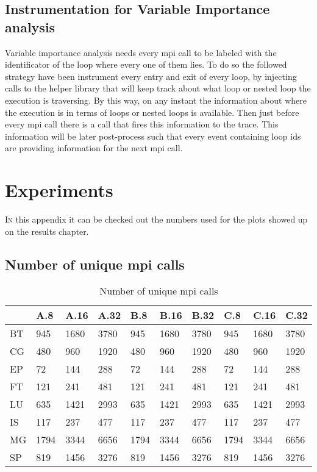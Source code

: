 \section{Instrumentation for Variable Importance analysis}

Variable importance analysis needs every mpi call to be labeled with the
identificator of the loop where every one of them lies. To do so the followed
strategy have been instrument every entry and exit of every loop, by injecting
calls to the helper library that will keep track about what loop or nested loop 
the execution is traversing. By this way, on any instant the
information about where the execution is in terms of loops or nested loops is
available. Then just before every mpi call there is a call that fires this
information to the trace. This information will be later post-process such
that every event containing loop ids are providing information for the next mpi
call. 

\chapter{Experiments}

\lettrine{I}{n} this appendix it can be checked out the numbers used for the plots showed up
on the results chapter.

\section{Number of unique mpi calls}\label{s:nunique_mpi_calls}

\begin{table}[h]
\centering
\label{tb:unique_mpi_calls}
\caption{Number of unique mpi calls}
\begin{tabular}{@{}llllllllll@{}}
\toprule
 & A.8 & A.16 & A.32 & B.8  & B.16 & B.32 & C.8  & C.16 & C.32 \\ \midrule
BT & 945 & 1680 & 3780 & 945  & 1680 & 3780 & 945  & 1680 & 3780 \\
CG & 480 & 960  & 1920 & 480  & 960  & 1920 & 480  & 960  & 1920 \\
EP & 72  & 144  & 288  & 72   & 144  & 288  & 72   & 144  & 288  \\ 
FT & 121 & 241  & 481  & 121  & 241  & 481  & 121  & 241  & 481  \\
LU & 635 & 1421 & 2993 & 635  & 1421 & 2993 & 635  & 1421 & 2993 \\
IS & 117 & 237  & 477  & 117  & 237  & 477  & 117  & 237  & 477  \\
MG & 1794 & 3344 & 6656 & 1794 & 3344 & 6656 & 1794 & 3344 & 6656 \\
SP & 819  & 1456 & 3276 & 819  & 1456 & 3276 & 819  & 1456 & 3276 \\ \bottomrule
\end{tabular}
\end{table}

